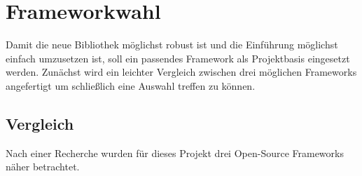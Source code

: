 \section{Frameworkwahl}
Damit die neue Bibliothek möglichst robust ist und die Einführung möglichst einfach umzusetzen ist, soll ein passendes Framework als Projektbasis eingesetzt werden. Zunächst wird ein leichter Vergleich zwischen drei möglichen Frameworks angefertigt um schließlich eine Auswahl treffen zu können.

\subsection{Vergleich}
\label{sec:frameworkComparision}
Nach einer Recherche wurden für dieses Projekt drei Open-Source Frameworks näher betrachtet.


